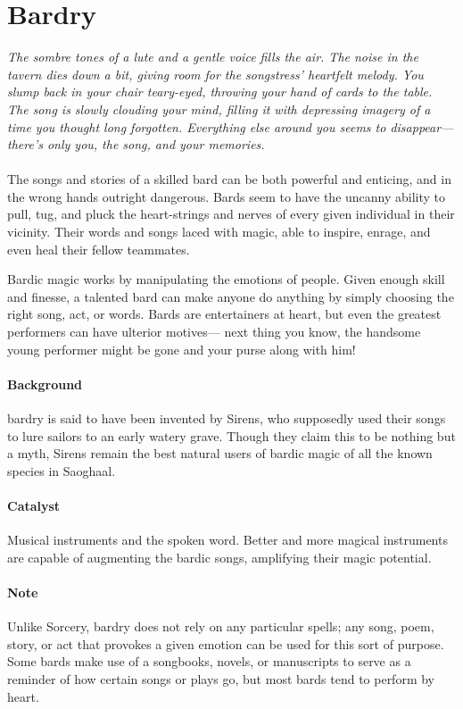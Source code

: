 \section{Bardry}
\textit{The sombre tones of a lute and a gentle voice fills the air.
The noise in the tavern dies down a bit, giving room for the songstress' heartfelt melody.
You slump back in your chair teary-eyed, throwing your hand of cards to the table.
The song is slowly clouding your mind, filling it with depressing imagery of a time you thought long forgotten.
Everything else around you seems to disappear---there's only you, the song, and your memories.}\\\\
The songs and stories of a skilled bard can be both powerful and enticing, and in the wrong hands outright dangerous.
Bards seem to have the uncanny ability to pull, tug, and pluck the heart-strings and nerves of every given individual in their vicinity.
Their words and songs laced with magic, able to inspire, enrage, and even heal their fellow teammates.

Bardic magic works by manipulating the emotions of people. 
Given enough skill and finesse, a talented bard can make anyone do anything by simply choosing the right song, act, or words.
Bards are entertainers at heart, but even the greatest performers can have ulterior motives---
next thing you know, the handsome young performer might be gone and your purse along with him!

\paragraph{Background} bardry is said to have been invented by Sirens, who supposedly used their songs to lure sailors to an early watery grave.
Though they claim this to be nothing but a myth, Sirens remain the best natural users of bardic magic of all the known species in Saoghaal.

\paragraph{Catalyst} Musical instruments and the spoken word.
Better and more magical instruments are capable of augmenting the bardic songs, amplifying their magic potential.

\paragraph{Note} Unlike Sorcery, bardry does not rely on any particular spells; 
any song, poem, story, or act that provokes a given emotion can be used for this sort of purpose.
Some bards make use of a songbooks, novels, or manuscripts to serve as a reminder of how certain songs or plays go, but most bards tend to perform by heart.